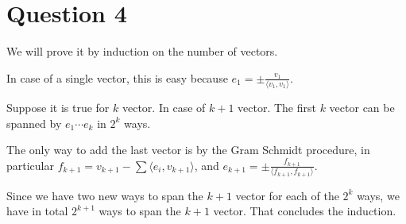 \section*{Question 4}
We will prove it by induction on the number of vectors.

In case of a single vector, this is easy because $ e_1 = \pm \frac{v_1}{\langle v_1, v_1 \rangle} $.

Suppose it is true for $ k $ vector. In case of $ k + 1 $ vector. The first $ k $ vector can be spanned by $ e_1 \cdots e_k $ in $ 2^k $ ways.

The only way to add the last vector is by the Gram Schmidt procedure, in particular $ f_{k+1} = v_{k+1} - \sum \langle e_i, v_{k+1} \rangle $, and $ e_{k+1} = \pm \frac{f_{k+1}}{\langle f_{k+1}, f_{k+1} \rangle }$.

Since we have two new ways to span the $ k + 1 $ vector for each of the $ 2^k $ ways, we have in total $ 2^{k+1} $ ways to span the $ k + 1 $ vector. That concludes the induction.
